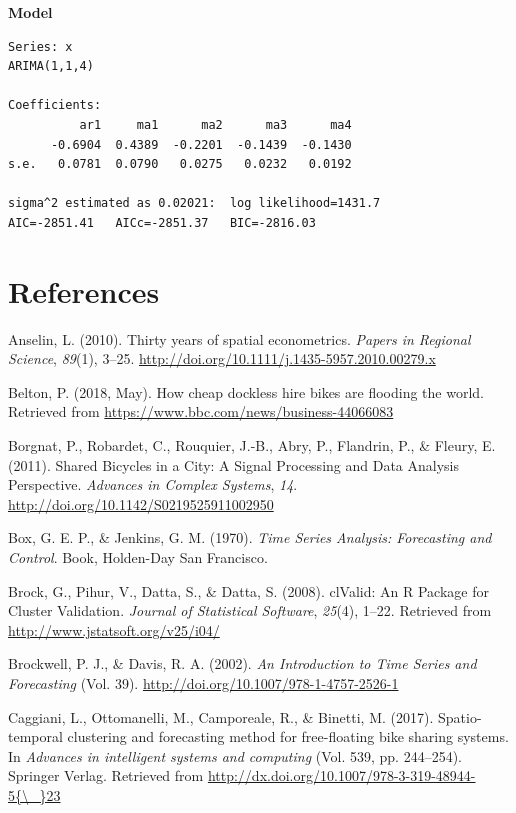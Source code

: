 \documentclass[12pt,oneside]{reedthesis}
\begin{document}
\textbf{Model}
\begin{verbatim}
Series: x 
ARIMA(1,1,4) 

Coefficients:
          ar1     ma1      ma2      ma3      ma4
      -0.6904  0.4389  -0.2201  -0.1439  -0.1430
s.e.   0.0781  0.0790   0.0275   0.0232   0.0192

sigma^2 estimated as 0.02021:  log likelihood=1431.7
AIC=-2851.41   AICc=-2851.37   BIC=-2816.03
\end{verbatim}
\backmatter

\chapter*{References}\label{references}


\noindent

\setlength{\parindent}{-0.20in} \setlength{\leftskip}{0.20in}
\setlength{\parskip}{8pt}

\hypertarget{refs}{}
\hypertarget{ref-anselin2010}{}
Anselin, L. (2010). Thirty years of spatial econometrics. \emph{Papers
in Regional Science}, \emph{89}(1), 3--25.
\url{http://doi.org/10.1111/j.1435-5957.2010.00279.x}

\hypertarget{ref-bbc}{}
Belton, P. (2018, May). How cheap dockless hire bikes are flooding the
world. Retrieved from \url{https://www.bbc.com/news/business-44066083}

\hypertarget{ref-borgnat2011}{}
Borgnat, P., Robardet, C., Rouquier, J.-B., Abry, P., Flandrin, P., \&
Fleury, E. (2011). Shared Bicycles in a City: A Signal Processing and
Data Analysis Perspective. \emph{Advances in Complex Systems},
\emph{14}. \url{http://doi.org/10.1142/S0219525911002950}

\hypertarget{ref-box1970}{}
Box, G. E. P., \& Jenkins, G. M. (1970). \emph{Time Series Analysis:
Forecasting and Control}. Book, Holden-Day San Francisco.

\hypertarget{ref-clValid}{}
Brock, G., Pihur, V., Datta, S., \& Datta, S. (2008). clValid: An R
Package for Cluster Validation. \emph{Journal of Statistical Software},
\emph{25}(4), 1--22. Retrieved from
\url{http://www.jstatsoft.org/v25/i04/}

\hypertarget{ref-brockwell2002}{}
Brockwell, P. J., \& Davis, R. A. (2002). \emph{An Introduction to Time
Series and Forecasting} (Vol. 39).
\url{http://doi.org/10.1007/978-1-4757-2526-1}

\hypertarget{ref-caggiani2017}{}
Caggiani, L., Ottomanelli, M., Camporeale, R., \& Binetti, M. (2017).
Spatio-temporal clustering and forecasting method for free-floating bike
sharing systems. In \emph{Advances in intelligent systems and computing}
(Vol. 539, pp. 244--254). Springer Verlag. Retrieved from
\href{http://dx.doi.org/10.1007/978-3-319-48944-5\%7B/_\%7D23}{http://dx.doi.org/10.1007/978-3-319-48944-5\{\textbackslash{}\_\}23}
\end{document}
